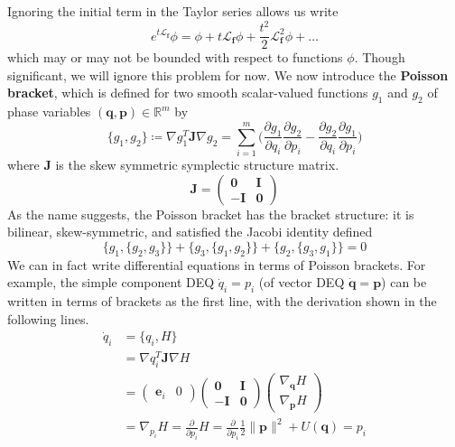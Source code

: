       Ignoring the initial term in the Taylor series allows us write 
      \begin{equation}
        e^{t \mathcal{L}_\mathbf{f}} \phi = \phi + t \mathcal{L}_\mathbf{f} \phi + \frac{t^2}{2} \mathcal{L}_\mathbf{f}^2 \phi + \ldots
      \end{equation}
      which may or may not be bounded with respect to functions $\phi$. Though significant, we will ignore this problem for now. We now introduce the \textbf{Poisson bracket}, which is defined for two smooth scalar-valued functions $g_1$ and $g_2$ of phase variables $(\mathbf{q}, \mathbf{p}) \in \mathbb{R}^m$ by 
      \begin{equation}
        \{g_1, g_2\} \coloneqq \nabla g_1^T \mathbf{J} \nabla g_2 = \sum_{i=1}^m \bigg( \frac{\partial g_1}{\partial q_i} \frac{\partial g_2}{\partial p_i} - \frac{ \partial g_2}{\partial q_i} \frac{\partial g_1}{\partial p_i} \bigg)
      \end{equation}
      where $\mathbf{J}$ is the skew symmetric symplectic structure matrix.
      \begin{equation}
        \mathbf{J} = \begin{pmatrix} \mathbf{0} & \mathbf{I} \\ -\mathbf{I} & \mathbf{0} \end{pmatrix}
      \end{equation}
      As the name suggests, the Poisson bracket has the bracket structure: it is bilinear, skew-symmetric, and satisfied the Jacobi identity defined 
      \begin{equation}
        \{ g_1, \{g_2, g_3\} \} + \{g_3, \{ g_1, g_2\}\} + \{g_2, \{g_3, g_1\}\} = 0
      \end{equation}
      We can in fact write differential equations in terms of Poisson brackets. For example, the simple component DEQ $\dot{q}_i = p_i$ (of vector DEQ $\mathbf{\dot{q}} = \mathbf{p}$) can be written in terms of brackets as the first line, with the derivation shown in the following lines. 
      \begin{align*}
        \dot{q}_i & = \{q_i, H\} \\
        & = \nabla q_i^T \mathbf{J} \nabla H \\
        & = \begin{pmatrix}
        \mathbf{e}_i & 0 
        \end{pmatrix} \begin{pmatrix}
        \mathbf{0} & \mathbf{I} \\ -\mathbf{I} & \mathbf{0} 
        \end{pmatrix} \begin{pmatrix}
        \nabla_\mathbf{q} H \\ \nabla_\mathbf{p} H 
        \end{pmatrix} \\
        & = \nabla_{p_i} H = \frac{\partial}{\partial p_i} H = \frac{\partial}{\partial p_i} \frac{1}{2} \|\mathbf{p}\|^2 + U(\mathbf{q}) = p_i
      \end{align*}
